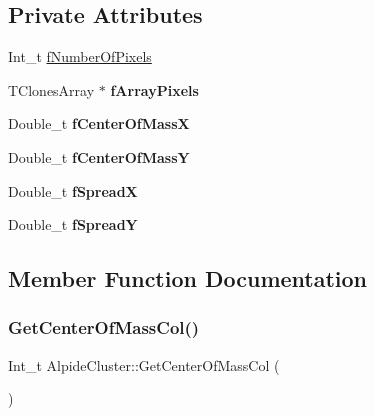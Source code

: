 \subsection*{Private Attributes}
\begin{DoxyCompactItemize}
\item 
Int\+\_\+t \mbox{\hyperlink{class_alpide_cluster_a201c3e825ff2d703e7d18d05c801495d}{f\+Number\+Of\+Pixels}}
\item 
\mbox{\label{class_alpide_cluster_a5a85490b4de8928b3fb1f46bd0303215}} 
T\+Clones\+Array $\ast$ {\bfseries f\+Array\+Pixels}
\item 
\mbox{\label{class_alpide_cluster_a10d6502e45adde8d36589033dcbf5846}} 
Double\+\_\+t {\bfseries f\+Center\+Of\+MassX}
\item 
\mbox{\label{class_alpide_cluster_a1925a67ccc2a7543facb3e3131ff9f16}} 
Double\+\_\+t {\bfseries f\+Center\+Of\+MassY}
\item 
\mbox{\label{class_alpide_cluster_adabdacb6a49b339e829f87c41ddb81cf}} 
Double\+\_\+t {\bfseries f\+SpreadX}
\item 
\mbox{\label{class_alpide_cluster_af0f6a4e861d7ba9ec2e7860c33dcf372}} 
Double\+\_\+t {\bfseries f\+SpreadY}
\end{DoxyCompactItemize}


\subsection{Member Function Documentation}
\mbox{\label{class_alpide_cluster_ae55b212b27e3675ae39fefe0609e64bc}} 
\subsubsection{\texorpdfstring{Get\+Center\+Of\+Mass\+Col()}{GetCenterOfMassCol()}}
{\footnotesize\ttfamily Int\+\_\+t Alpide\+Cluster\+::\+Get\+Center\+Of\+Mass\+Col (\begin{DoxyParamCaption}{ }\end{DoxyParamCaption})}

